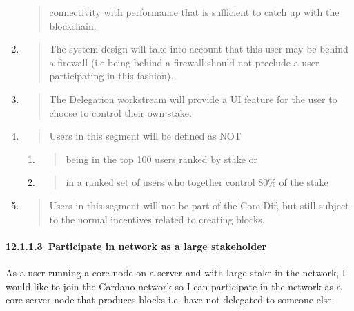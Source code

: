 \documentclass[11pt,a4paper]{article}
\begin{document}
\begin{enumerate}
\begin{quote}
  connectivity with performance that is sufficient to catch up with the
  blockchain.
  \end{quote}
\item
  \begin{quote}
  The system design will take into account that this user may be behind
  a firewall (i.e being behind a firewall should not preclude a user
  participating in this fashion).
  \end{quote}
\item
  \begin{quote}
  The Delegation workstream will provide a UI feature for the user to
  choose to control their own stake.
  \end{quote}
\item
  \begin{quote}
  Users in this segment will be defined as NOT
  \end{quote}

  \begin{enumerate}
  \def\labelenumii{\alph{enumii}.}
  \item
    \begin{quote}
    being in the top 100 users ranked by stake or
    \end{quote}
  \item
    \begin{quote}
    in a ranked set of users who together control 80\% of the stake
    \end{quote}
  \end{enumerate}
\item
  \begin{quote}
  Users in this segment will not be part of the Core Dif, but still
  subject to the normal incentives related to creating blocks.
  \end{quote}
\end{enumerate}

\hypertarget{participate-in-network-as-a-large-stakeholder}{%
\paragraph{​12.1.1.3​~Participate in network as a large stakeholder
}\label{participate-in-network-as-a-large-stakeholder}}

As a user running a core node on a server and with large stake in the
network, I would like to join the Cardano network so I can participate
in the network as a core server node that produces blocks i.e. have not
delegated to someone else.
\end{document}
